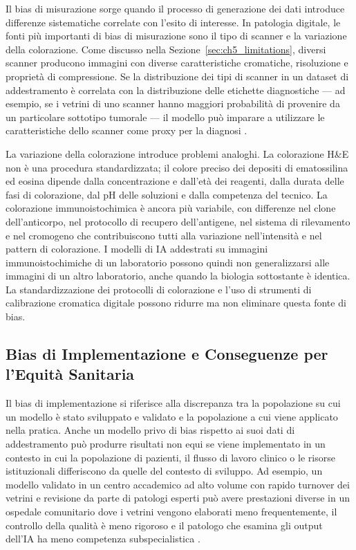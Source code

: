 Il bias di misurazione sorge quando il processo di generazione dei dati introduce differenze sistematiche correlate con l'esito di interesse. In patologia digitale, le fonti più importanti di bias di misurazione sono il tipo di scanner e la variazione della colorazione. Come discusso nella Sezione~\ref{sec:ch5_limitations}, diversi scanner producono immagini con diverse caratteristiche cromatiche, risoluzione e proprietà di compressione. Se la distribuzione dei tipi di scanner in un dataset di addestramento è correlata con la distribuzione delle etichette diagnostiche — ad esempio, se i vetrini di uno scanner hanno maggiori probabilità di provenire da un particolare sottotipo tumorale — il modello può imparare a utilizzare le caratteristiche dello scanner come proxy per la diagnosi \cite{howard2021}.

La variazione della colorazione introduce problemi analoghi. La colorazione H\&E non è una procedura standardizzata; il colore preciso dei depositi di ematossilina ed eosina dipende dalla concentrazione e dall'età dei reagenti, dalla durata delle fasi di colorazione, dal pH delle soluzioni e dalla competenza del tecnico. La colorazione immunoistochimica è ancora più variabile, con differenze nel clone dell'anticorpo, nel protocollo di recupero dell'antigene, nel sistema di rilevamento e nel cromogeno che contribuiscono tutti alla variazione nell'intensità e nel pattern di colorazione. I modelli di IA addestrati su immagini immunoistochimiche di un laboratorio possono quindi non generalizzarsi alle immagini di un altro laboratorio, anche quando la biologia sottostante è identica. La standardizzazione dei protocolli di colorazione e l'uso di strumenti di calibrazione cromatica digitale possono ridurre ma non eliminare questa fonte di bias.

\subsection{Bias di Implementazione e Conseguenze per l'Equità Sanitaria}

Il bias di implementazione si riferisce alla discrepanza tra la popolazione su cui un modello è stato sviluppato e validato e la popolazione a cui viene applicato nella pratica. Anche un modello privo di bias rispetto ai suoi dati di addestramento può produrre risultati non equi se viene implementato in un contesto in cui la popolazione di pazienti, il flusso di lavoro clinico o le risorse istituzionali differiscono da quelle del contesto di sviluppo. Ad esempio, un modello validato in un centro accademico ad alto volume con rapido turnover dei vetrini e revisione da parte di patologi esperti può avere prestazioni diverse in un ospedale comunitario dove i vetrini vengono elaborati meno frequentemente, il controllo della qualità è meno rigoroso e il patologo che esamina gli output dell'IA ha meno competenza subspecialistica \cite{zhang2023}.

